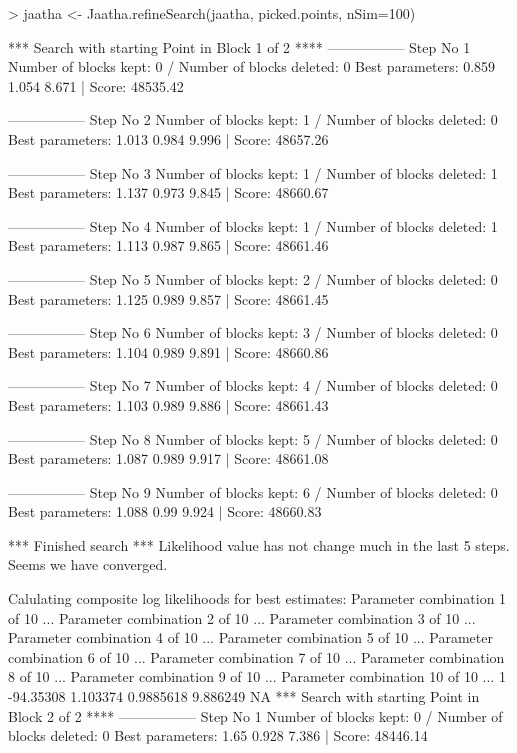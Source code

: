 
\begin{Schunk}
\begin{Sinput}
> jaatha <- Jaatha.refineSearch(jaatha, picked.points, nSim=100)
\end{Sinput}
\begin{Soutput}
*** Search with starting Point in Block 1 of 2 **** 
----------------- 
Step No 1 
Number of blocks kept: 0  / Number of blocks deleted: 0 
Best parameters:  0.859 1.054 8.671 | Score: 48535.42 

----------------- 
Step No 2 
Number of blocks kept: 1  / Number of blocks deleted: 0 
Best parameters:  1.013 0.984 9.996 | Score: 48657.26 

----------------- 
Step No 3 
Number of blocks kept: 1  / Number of blocks deleted: 1 
Best parameters:  1.137 0.973 9.845 | Score: 48660.67 

----------------- 
Step No 4 
Number of blocks kept: 1  / Number of blocks deleted: 1 
Best parameters:  1.113 0.987 9.865 | Score: 48661.46 

----------------- 
Step No 5 
Number of blocks kept: 2  / Number of blocks deleted: 0 
Best parameters:  1.125 0.989 9.857 | Score: 48661.45 

----------------- 
Step No 6 
Number of blocks kept: 3  / Number of blocks deleted: 0 
Best parameters:  1.104 0.989 9.891 | Score: 48660.86 

----------------- 
Step No 7 
Number of blocks kept: 4  / Number of blocks deleted: 0 
Best parameters:  1.103 0.989 9.886 | Score: 48661.43 

----------------- 
Step No 8 
Number of blocks kept: 5  / Number of blocks deleted: 0 
Best parameters:  1.087 0.989 9.917 | Score: 48661.08 

----------------- 
Step No 9 
Number of blocks kept: 6  / Number of blocks deleted: 0 
Best parameters:  1.088 0.99 9.924 | Score: 48660.83 

*** Finished search *** 
Likelihood value has not change much in the last 5 steps. 
Seems we have converged. 

Calulating composite log likelihoods for best estimates: 
Parameter combination 1 of 10 ... 
Parameter combination 2 of 10 ... 
Parameter combination 3 of 10 ... 
Parameter combination 4 of 10 ... 
Parameter combination 5 of 10 ... 
Parameter combination 6 of 10 ... 
Parameter combination 7 of 10 ... 
Parameter combination 8 of 10 ... 
Parameter combination 9 of 10 ... 
Parameter combination 10 of 10 ... 
1	-94.35308	1.103374	0.9885618	9.886249	NA	
*** Search with starting Point in Block 2 of 2 **** 
----------------- 
Step No 1 
Number of blocks kept: 0  / Number of blocks deleted: 0 
Best parameters:  1.65 0.928 7.386 | Score: 48446.14 


\end{Soutput}
\end{Schunk}
